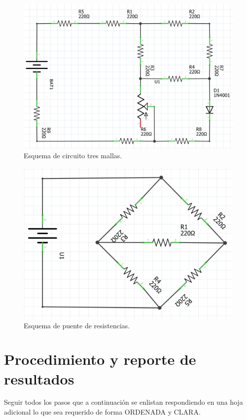 \documentclass[letterpaper, 12 pt, conference]{ieeeconf}  %
\begin{document}
\begin{figure}[h!]
    \centering
    \includegraphics[scale=0.7]{C1.png}
    \caption{Esquema de circuito tres mallas.}
\end{figure}

\begin{figure}[h!]
    \centering
    \includegraphics[scale=0.5]{C2.png}
    \caption{Esquema de puente de resistencias.}
\end{figure}


\section{Procedimiento y reporte de resultados}
Seguir todos los pasos que a continuación se enlistan respondiendo en una hoja adicional lo que sea requerido de forma ORDENADA y CLARA.
\end{document}
